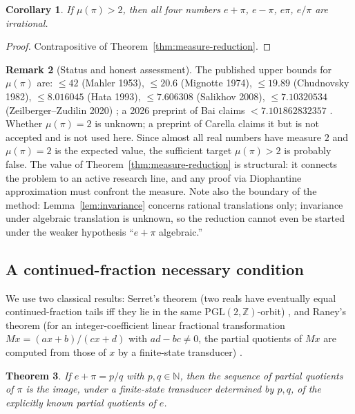 \documentclass[11pt]{amsart}
\newtheorem{theorem}{Theorem}[section]
\newtheorem{corollary}[theorem]{Corollary}
\theoremstyle{definition}
\newtheorem{remark}[theorem]{Remark}
\theoremstyle{remark}
\numberwithin{equation}{section}
\newcommand{\Z}{\mathbb{Z}}
\newcommand{\N}{\mathbb{N}}
\newcommand{\irr}{\mu}
\newcommand{\ee}{e}
\begin{document}
\begin{corollary}\label{cor:four-irrational}
If $\irr(\pi)>2$, then all four numbers $e+\pi$, $e-\pi$, $e\pi$, $e/\pi$ are irrational.
\end{corollary}

\begin{proof}
Contrapositive of Theorem~\ref{thm:measure-reduction}.
\end{proof}

\begin{remark}[Status and honest assessment]
The published upper bounds for $\irr(\pi)$ are: $\le42$ (Mahler 1953), $\le20.6$ (Mignotte 1974), $\le19.89$ (Chudnovsky 1982), $\le8.016045$ (Hata 1993), $\le7.606308$ (Salikhov 2008), $\le7.10320534$ (Zeilberger--Zudilin 2020) \cite{Alekseyev2011,ZZ2020}; a 2026 preprint of Bai claims $<7.101862832357$ \cite{Bai2026}. Whether $\irr(\pi)=2$ is unknown; a preprint of Carella claims it \cite{CarellaMeasure} but is not accepted and is not used here. Since almost all real numbers have measure $2$ and $\irr(\pi)=2$ is the expected value, the sufficient target $\irr(\pi)>2$ is probably false. The value of Theorem~\ref{thm:measure-reduction} is structural: it connects the problem to an active research line, and any proof via Diophantine approximation must confront the measure. Note also the boundary of the method: Lemma~\ref{lem:invariance} concerns rational translations only; invariance under algebraic translation is unknown, so the reduction cannot even be started under the weaker hypothesis ``$e+\pi$ algebraic.''
\end{remark}

\subsection{A continued-fraction necessary condition}

We use two classical results: Serret's theorem (two reals have eventually equal continued-fraction tails iff they lie in the same $\mathrm{PGL}(2,\Z)$-orbit) \cite{Panti2017}, and Raney's theorem (for an integer-coefficient linear fractional transformation $Mx=(ax+b)/(cx+d)$ with $ad-bc\ne0$, the partial quotients of $Mx$ are computed from those of $x$ by a finite-state transducer) \cite{Raney1973}.

\begin{theorem}\label{thm:cf}
If $e+\pi=p/q$ with $p,q\in\N$, then the sequence of partial quotients of $\pi$ is the image, under a finite-state transducer determined by $p,q$, of the explicitly known partial quotients of $\ee$.
\end{theorem}
\end{document}
